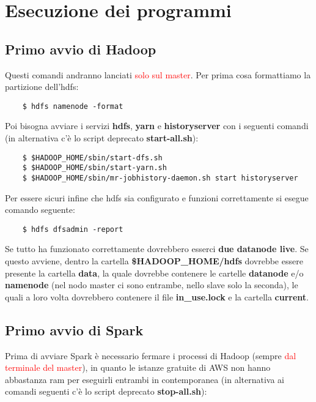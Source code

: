 \section{Esecuzione dei programmi}



\subsection{Primo avvio di Hadoop}

Questi comandi andranno lanciati \textcolor{red}{solo sul master}. Per prima cosa formattiamo la partizione dell'hdfs:

\begin{verbatim}
    $ hdfs namenode -format
\end{verbatim}

Poi bisogna avviare i servizi \textbf{hdfs}, \textbf{yarn} e \textbf{historyserver} con i seguenti comandi (in alternativa c'è lo script deprecato \textbf{start-all.sh}):

\begin{verbatim}
    $ $HADOOP_HOME/sbin/start-dfs.sh
    $ $HADOOP_HOME/sbin/start-yarn.sh
    $ $HADOOP_HOME/sbin/mr-jobhistory-daemon.sh start historyserver
\end{verbatim}

Per essere sicuri infine che hdfs sia configurato e funzioni correttamente si esegue comando seguente:

\begin{verbatim}
    $ hdfs dfsadmin -report
\end{verbatim}

Se tutto ha funzionato correttamente dovrebbero esserci \textbf{due datanode live}. Se questo avviene, dentro la cartella \textbf{\$HADOOP\_HOME/hdfs} dovrebbe essere presente la cartella \textbf{data}, la quale dovrebbe contenere le cartelle \textbf{datanode} e/o \textbf{namenode} (nel nodo master ci sono entrambe, nello slave solo la seconda), le quali a loro volta dovrebbero contenere il file \textbf{in\_use.lock} e la cartella \textbf{current}.



\subsection{Primo avvio di Spark}

Prima di avviare Spark è necessario fermare i processi di Hadoop (sempre \textcolor{red}{dal terminale del master}), in quanto le istanze gratuite di AWS non hanno abbastanza ram per eseguirli entrambi in contemporanea (in alternativa ai comandi seguenti c'è lo script deprecato \textbf{stop-all.sh}):

